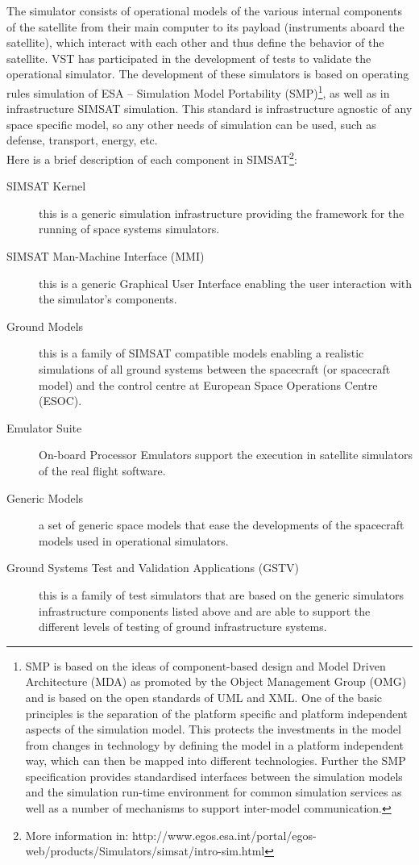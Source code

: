 \documentclass[a4paper,UKenglish]{oasics}
\begin{document}
The simulator consists of operational models of the various internal components of the satellite from their main computer to its payload (instruments aboard the satellite),
which interact with each other and thus define the behavior of the satellite.
VST has participated in the development of tests to validate the operational simulator.
The development of these simulators is based on operating rules simulation of
ESA -- Simulation Model Portability (SMP)\footnote{SMP is based on the ideas of component-based design and Model Driven Architecture (MDA)
as promoted by the Object Management Group (OMG) and is based on the open standards of UML and XML.
One of the basic principles is the separation of the platform specific and platform independent aspects of the simulation model.
This protects the investments in the model from changes in technology by defining the model in a platform independent way, which can then be mapped into different technologies.
Further the SMP specification provides standardised interfaces between the simulation models and the simulation run-time environment for common simulation services as well as a
number of mechanisms to support inter-model communication.\cite{1A,2A,3A,4A,5A}}, as well as in infrastructure SIMSAT simulation.
This standard is infrastructure agnostic of any space specific model, so any other needs of simulation can be used, such as defense, transport, energy, etc.\\

Here is a brief description of each component in SIMSAT\footnote{More information in: http://www.egos.esa.int/portal/egos-web/products/Simulators/simsat/intro-sim.html}:
\begin{description}
\item[SIMSAT Kernel] this is a generic simulation infrastructure providing the framework for the running of space systems simulators.
\item[SIMSAT Man-Machine Interface (MMI)] this is a generic Graphical User Interface enabling the user interaction with the simulator's components.
\item[Ground Models] this is a family of SIMSAT compatible models enabling a realistic simulations of all ground systems between the spacecraft (or spacecraft model) and the control centre at European Space Operations Centre (ESOC).
\item[Emulator Suite] On-board Processor Emulators support the execution in satellite simulators of the real flight software.
\item[Generic Models] a set of generic space models that ease the developments of the spacecraft models used in operational simulators.
\item[Ground Systems Test and Validation Applications (GSTV)] this is a family of test simulators that are based on the generic simulators infrastructure components listed above and are able to support the different levels of testing of ground infrastructure systems.
\end{description}
\end{document}
